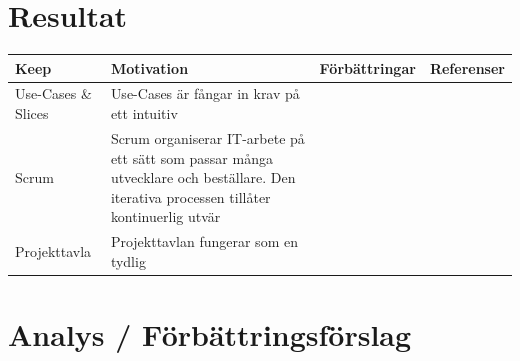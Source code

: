 \documentclass[conference,a4paper]{IEEEtran}
\newcommand\Tstrut{\rule{0pt}{2.6ex}}       %
\newcommand\Bstrut{\rule[-0.9ex]{0pt}{0pt}} %
\newcommand{\TBstrut}{\Tstrut\Bstrut} %
\begin{document}
\section{Resultat} \label{sec:res}

%

\begin{table}[H]
	\small
  \centering
	\begin{tabular}{|p{1.5cm}|p{2cm}|p{1.8cm}|p{1.5cm}|} %
    \hline
    Keep & Motivation & Förbättringar & Referenser \TBstrut \\
    \hline
    Use-Cases \& Slices & Use-Cases är fångar in krav på ett intuitiv & & \TBstrut \\
    \hline
    Scrum & Scrum organiserar IT-arbete på ett sätt som passar många utvecklare och beställare. Den iterativa processen tillåter kontinuerlig utvär & & \TBstrut \\
    \hline
    Projekttavla & Projekttavlan fungerar som en tydlig & & \TBstrut \\
    \hline
  \end{tabular}
\end{table}

\section{Analys / Förbättringsförslag} \label{sec:analys}
\end{document}
